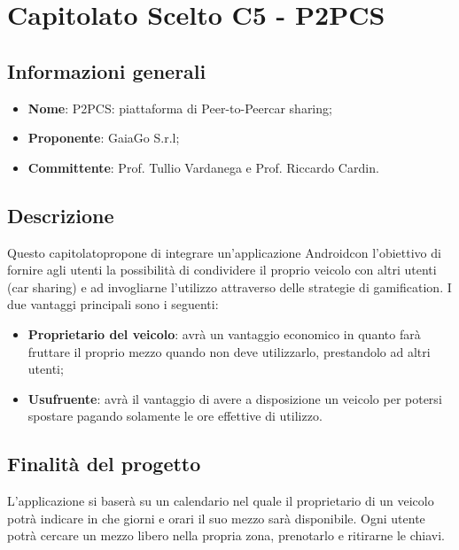 \section{Capitolato Scelto C5 - P2PCS}
\subsection{Informazioni generali}
\begin{itemize}
\item \textbf{Nome}: P2PCS: piattaforma di Peer-to-Peer\glosp car sharing;
\item \textbf{Proponente}: GaiaGo S.r.l;
\item \textbf{Committente}: Prof. Tullio Vardanega e Prof. Riccardo Cardin.
\end{itemize}
\subsection{Descrizione}
Questo capitolato\glosp propone di integrare un'applicazione Android\glosp con l'obiettivo di fornire agli utenti la possibilità di condividere il proprio veicolo con altri utenti (car sharing) e ad invogliarne l'utilizzo attraverso delle strategie di gamification\glo. 
I due vantaggi principali sono i seguenti:
\begin{itemize}
	\item \textbf{Proprietario del veicolo}: avrà un vantaggio economico in quanto farà fruttare il proprio mezzo quando non deve utilizzarlo, prestandolo ad altri utenti;
	\item \textbf{Usufruente}: avrà il vantaggio di avere a disposizione un veicolo per potersi spostare pagando solamente le ore effettive di utilizzo.
\end{itemize}
\subsection{Finalità del progetto}
L'applicazione si baserà su un calendario nel quale il proprietario di un veicolo potrà indicare in che giorni e orari il suo mezzo sarà disponibile. Ogni utente potrà cercare un mezzo libero nella propria zona, prenotarlo e ritirarne le chiavi.
